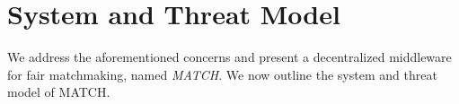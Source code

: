 



\section{System and Threat Model}
We address the aforementioned concerns and present a decentralized middleware for fair matchmaking, named \emph{MATCH}.
We now outline the system and threat model of MATCH.

